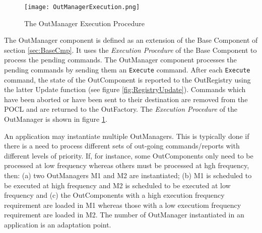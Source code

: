 \begin{figure}[h]
 \centering
 \texttt{[image: OutManagerExecution.png]}
 \caption{The OutManager Execution Procedure}
 \label{fig:OutManagerExecution}
\end{figure}

The OutManager component is defined as an extension of the Base Component of section \ref{sec:BaseCmp}. It uses the \textit{Execution Procedure} of the Base Component to process the pending commands. The OutManager component processes the pending commands by sending them an \texttt{Execute} command. After each \texttt{Execute} command, the state of the OutComponent is reported to the OutRegistry using the latter Update function (see figure \ref{fig:RegistryUpdate}). Commands which have been aborted or have been sent to their destination are removed from the POCL and are returned to the OutFactory. The \textit{Execution Procedure} of the OutManager is shown in figure \ref{fig:OutManagerExecution}.


An application may instantiate multiple OutManagers. This is typically done if there is a need to process different sets of out-going commands/reports with different levels of priority. If, for instance, some OutComponents only need to be processed at low frequency whereas others must be processed at hgh frequency, then: (a) two OutManagers M1 and M2 are instantiated; (b) M1 is scheduled to be executed at high frequency and M2 is scheduled to be executed at low frequency and (c) the OutComponents with a high execution frequency requirement are loaded in M1 whereas those with a low executiom frequency requirement are loaded in M2. The number of OutManager instantiated in an application is an adaptation point. 

